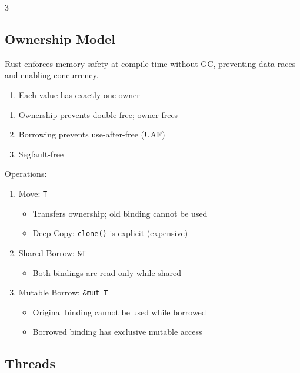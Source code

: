 \documentclass[12pt, a4paper]{article}
\begin{document}
\begin{multicols*}{3}
\subsection{Ownership Model}
Rust enforces memory-safety at compile-time without GC, preventing data races and enabling concurrency.
\begin{enumerate}[\roman*.]
  \item Each value has exactly one owner 
\end{enumerate}
\begin{enumerate}[$+$]\vspace{-1pt}
  \item Ownership prevents double-free; owner frees 
  \item Borrowing prevents use-after-free (UAF)
  \item Segfault-free
\end{enumerate}

Operations:
\begin{enumerate}[\roman*.]
  \item Move: \lstinline|T|
  \begin{itemize}[leftmargin=*]\vspace{3pt}
    \item Transfers ownership; old binding cannot be used
    \item Deep Copy: \lstinline|clone()| is explicit (expensive)
  \end{itemize}
  \item Shared Borrow: \lstinline|&T|
  \begin{itemize}[leftmargin=*]\vspace{3pt}
    \item Both bindings are read-only while shared
  \end{itemize}
  \item Mutable Borrow: \lstinline|&mut T|
  \begin{itemize}[leftmargin=*]\vspace{3pt}
    \item Original binding cannot be used while borrowed
    \item Borrowed binding has exclusive mutable access
  \end{itemize}
\end{enumerate}

\subsection{Threads}


\end{multicols*}
\end{document}
